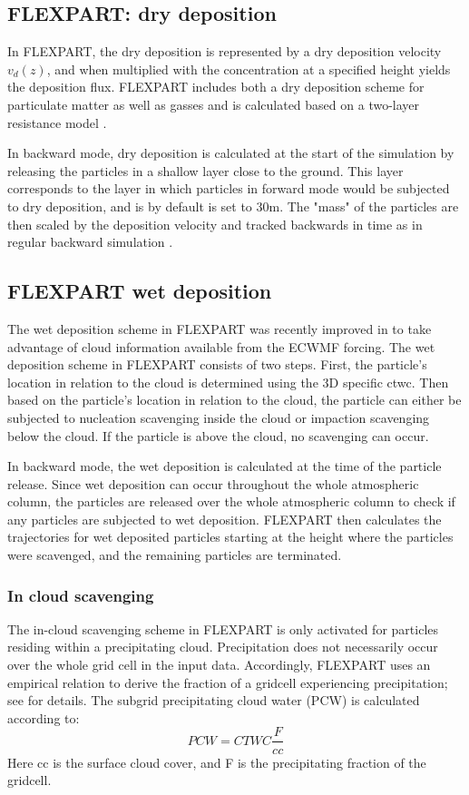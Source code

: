 \subsection{FLEXPART: dry deposition}
In FLEXPART, the dry deposition is represented by a dry deposition velocity $v_d(z)$, and when multiplied with the concentration at a specified height yields the deposition flux. 
FLEXPART includes both a dry deposition scheme for particulate matter as well as gasses and is calculated based on a two-layer resistance model \parencite{Flexpart-2005_ref_paper}.

In backward mode, dry deposition is calculated at the start of the simulation by releasing the particles in a shallow layer close to the ground. This layer corresponds to the layer in which particles in forward mode would be subjected to dry deposition, and is by default is set to 30m. The "mass" of the particles are then scaled by the deposition velocity and tracked backwards in time as in regular backward simulation \parencite{eckhardt2017source}. 

\subsection{FLEXPART wet deposition}
The wet deposition scheme in FLEXPART was recently improved in \textcite{flexpart_wetdep} to take advantage of cloud information available from the ECWMF forcing. The wet deposition scheme in FLEXPART consists of two steps.
First, the particle's location in relation to the cloud is determined using the 3D specific \acrfull{ctwc}. Then based on the particle's location in relation to the cloud, the particle can either be subjected to nucleation scavenging inside the cloud or impaction scavenging below the cloud. If the particle is above the cloud, no scavenging can occur. 

In backward mode, the wet deposition is calculated at the time of the particle release. Since wet deposition can occur throughout the whole atmospheric column, the particles are released over the whole atmospheric column to check if any particles are subjected to wet deposition. FLEXPART then calculates the trajectories for wet deposited particles starting at the height where the particles were scavenged, and the remaining particles are terminated.    
\subsubsection{In cloud scavenging}
The in-cloud scavenging scheme in FLEXPART is only activated for particles residing within a precipitating cloud. Precipitation does not necessarily occur over the whole grid cell in the input data. Accordingly, FLEXPART uses an empirical relation to derive the fraction of a gridcell experiencing precipitation; see \textcite{Flexpart-2005_ref_paper} for details. The subgrid precipitating cloud water (PCW) is calculated according to: 
\begin{equation}
    PCW = CTWC\frac{F}{cc}
\end{equation}
Here cc is the surface cloud cover, and F is the precipitating fraction of the gridcell. 

